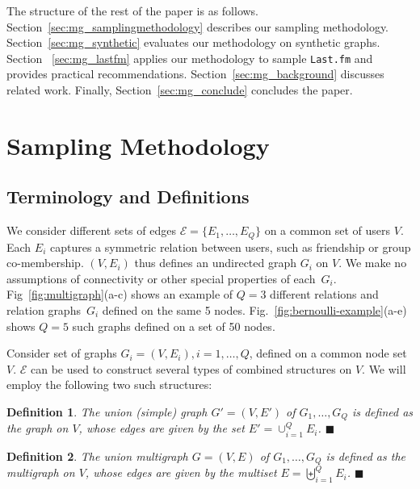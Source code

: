 \documentclass[10pt, conference]{./IEEEtran}
\newcommand{\eq}{\!\!=\!\!}
\newtheorem{definition}{Definition}
\begin{document}
%
%



The structure of the rest of the paper is as follows.  Section~\ref{sec:mg_samplingmethodology} describes our sampling methodology. %
Section~\ref{sec:mg_synthetic} evaluates our methodology on synthetic graphs. Section ~\ref{sec:mg_lastfm} applies our methodology to sample {\tt Last.fm} and provides practical recommendations. Section~\ref{sec:mg_background} discusses related work. 
%
Finally, Section~\ref{sec:mg_conclude} concludes the paper.









\section{Sampling Methodology\label{sec:mg_samplingmethodology}}


\subsection{Terminology and Definitions}




We consider different sets of edges $\mathcal{E}=\{E_1, \ldots, E_Q\}$ on a common set of users $V$.  Each $E_i$ captures a symmetric relation between users, such as friendship or group co-membership. $(V, E_i)$ thus defines an undirected graph $G_i$ on $V$.
We make no assumptions of connectivity or other special properties of each~$G_i$.
%
Fig~\ref{fig:multigraph}(a-c) shows an example of $Q\eq 3$ different relations and relation graphs~$G_i$ defined on the same 5 nodes.
Fig.~\ref{fig:bernoulli-example}(a-e) shows $Q\eq 5$ such graphs defined on a set of 50 nodes.

Consider set of graphs $G_i=(V, E_i), i=1,\ldots,Q$, defined on a common node set $V$. $\mathcal{E}$ can be used to construct several types of combined structures on $V$. We will employ the following two such structures:

\begin{definition}\label{def:uniongraph}
The {\em union (simple) graph} $G'=(V,E')$ of $G_1,\ldots,G_Q$ is defined as the graph on $V$,  whose edges are given by the set  $E'=\cup_{i=1}^Q E_i$. %
\hfill $\blacksquare$
\end{definition}

\begin{definition}\label{def:multigraph}
The {\em union multigraph} $G=(V,E)$ of $G_1,\ldots,G_Q$ is defined as the multigraph on $V$, whose edges are given by the multiset $E=\biguplus_{i=1}^Q E_i$. 
\hfill $\blacksquare$
\end{definition}
\end{document}
